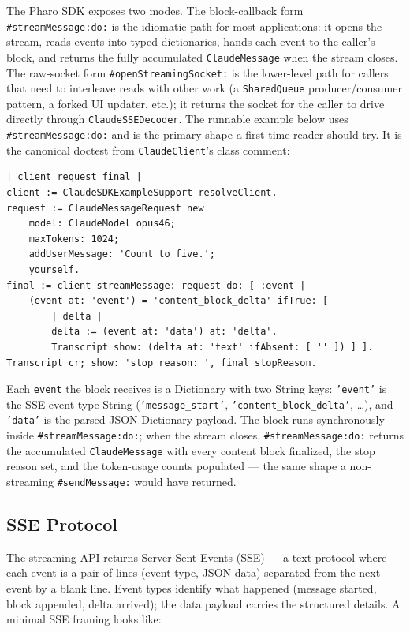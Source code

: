 \documentclass[a4paper,10pt,fleqn]{article}
\newcommand{\cls}[1]{\texttt{#1}}
\newcommand{\sel}[1]{\texttt{\##1}}
\begin{document}
The Pharo SDK exposes two modes.  The block-callback form
\sel{streamMessage:do:} is the idiomatic path for most
applications: it opens the stream, reads events into typed
dictionaries, hands each event to the caller's block, and
returns the fully accumulated \cls{ClaudeMessage} when the
stream closes.  The raw-socket form \sel{openStreamingSocket:}
is the lower-level path for callers that need to interleave
reads with other work (a \cls{SharedQueue} producer/consumer
pattern, a forked UI updater, etc.); it returns the socket for
the caller to drive directly through \cls{ClaudeSSEDecoder}.
The runnable example below uses \sel{streamMessage:do:} and is
the primary shape a first-time reader should try.  It is the
canonical doctest from \texttt{ClaudeClient}'s class comment:

\begin{lstlisting}[language={}]
| client request final |
client := ClaudeSDKExampleSupport resolveClient.
request := ClaudeMessageRequest new
	model: ClaudeModel opus46;
	maxTokens: 1024;
	addUserMessage: 'Count to five.';
	yourself.
final := client streamMessage: request do: [ :event |
	(event at: 'event') = 'content_block_delta' ifTrue: [
		| delta |
		delta := (event at: 'data') at: 'delta'.
		Transcript show: (delta at: 'text' ifAbsent: [ '' ]) ] ].
Transcript cr; show: 'stop reason: ', final stopReason.
\end{lstlisting}

Each \texttt{event} the block receives is a Dictionary with two
String keys: \texttt{'event'} is the SSE event-type String
(\texttt{'message\_start'}, \texttt{'content\_block\_delta'},
\ldots), and \texttt{'data'} is the parsed-JSON Dictionary
payload.  The block runs synchronously inside
\sel{streamMessage:do:}; when the stream closes,
\sel{streamMessage:do:} returns the accumulated
\cls{ClaudeMessage} with every content block finalized, the
stop reason set, and the token-usage counts populated --- the
same shape a non-streaming \sel{sendMessage:} would have
returned.

\subsection{SSE Protocol}

The streaming API returns Server-Sent Events (SSE) --- a text
protocol where each event is a pair of lines (event type, JSON
data) separated from the next event by a blank line.  Event
types identify what happened (message started, block appended,
delta arrived); the data payload carries the structured
details.  A minimal SSE framing looks like:
\end{document}
